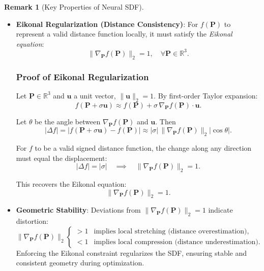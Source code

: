 \documentclass[12pt,a4paper]{article}
\theoremstyle{definition}
\newtheorem{remark}{Remark}[subsection]
\begin{document}
\begin{remark}[Key Properties of Neural SDF]
\begin{itemize}
    \item \textbf{Eikonal Regularization (Distance Consistency)}: For $f(\mathbf{P})$ to represent a valid distance function locally, it must satisfy the \textit{Eikonal equation}:
    \begin{equation}
    \|\nabla_{\mathbf{P}} f(\mathbf{P})\|_2 = 1, \quad \forall \mathbf{P} \in \mathbb{R}^3. \label{eq:eikonal_constraint}
    \end{equation}


    \subsubsection*{Proof of Eikonal Regularization}

    Let $\mathbf{P} \in \mathbb{R}^3$ and $\mathbf{u}$ a unit vector, $\|\mathbf{u}\|_2 = 1$. By first-order Taylor expansion:
    \[
    f(\mathbf{P} + \sigma \mathbf{u}) \approx f(\mathbf{P}) + \sigma \, \nabla_{\mathbf{P}} f(\mathbf{P}) \cdot \mathbf{u}.
    \]

    Let $\theta$ be the angle between $\nabla_{\mathbf{P}} f(\mathbf{P})$ and $\mathbf{u}$. Then
    \[
    |\Delta f| = |f(\mathbf{P} + \sigma \mathbf{u}) - f(\mathbf{P})| \approx |\sigma| \, \|\nabla_{\mathbf{P}} f(\mathbf{P})\|_2 |\cos \theta|.
    \]

    For $f$ to be a valid signed distance function, the change along any direction must equal the displacement:
    \[
    |\Delta f| = |\sigma| \quad \implies \quad \|\nabla_{\mathbf{P}} f(\mathbf{P})\|_2 = 1.
    \]

    This recovers the Eikonal equation:
    \[
    \boxed{\|\nabla_{\mathbf{P}} f(\mathbf{P})\|_2 = 1}.
    \]

    \item \textbf{Geometric Stability}: Deviations from $\|\nabla_{\mathbf{P}} f(\mathbf{P})\|_2 = 1$ indicate distortion:
    \[
    \|\nabla_{\mathbf{P}} f(\mathbf{P})\|_2
    \begin{cases}
    > 1 & \text{implies local stretching (distance overestimation)}, \\
    < 1 & \text{implies local compression (distance underestimation)}.
    \end{cases}
    \]
    Enforcing the Eikonal constraint regularizes the SDF, ensuring stable and consistent geometry during optimization.
    
\end{itemize}
\end{remark}
\end{document}
